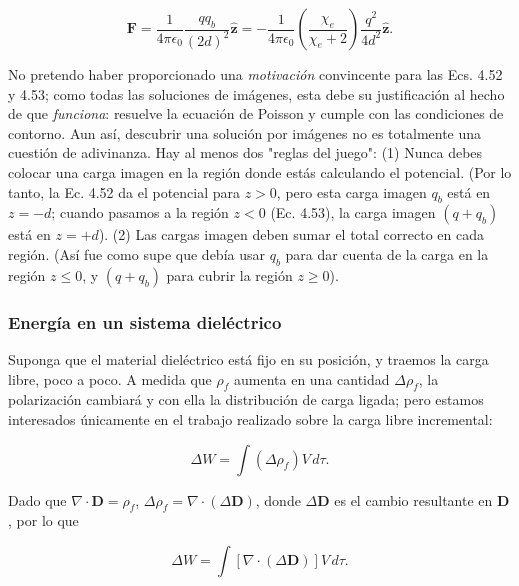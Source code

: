 \documentclass[12pt,a4paper]{report}
\newcommand{\esp}{\vspace{0.5cm}}
\begin{document}
	\esp
	
	\begin{equation}
		\mathbf{F} = \frac{1}{4\pi\epsilon_0} \frac{qq_b}{(2d)^2} \hat{\mathbf{z}} = -\frac{1}{4\pi\epsilon_0} \left( \frac{\chi_e}{\chi_e + 2} \right) \frac{q^2}{4d^2} \hat{\mathbf{z}}.
	\end{equation}
	
	\esp
	
	\noindent No pretendo haber proporcionado una \textit{motivación} convincente para las Ecs. 4.52 y 4.53; como todas las soluciones de imágenes, esta debe su justificación al hecho de que \textit{funciona}: resuelve la ecuación de Poisson y cumple con las condiciones de contorno. Aun así, descubrir una solución por imágenes no es totalmente una cuestión de adivinanza. Hay al menos dos "reglas del juego": (1) Nunca debes colocar una carga imagen en la región donde estás calculando el potencial. (Por lo tanto, la Ec. 4.52 da el potencial para $z > 0$, pero esta carga imagen $q_b$ está en $z = -d$; cuando pasamos a la región $z < 0$ (Ec. 4.53), la carga imagen $(q + q_b)$ está en $z = +d$). (2) Las cargas imagen deben sumar el total correcto en cada región. (Así fue como supe que debía usar $q_b$ para dar cuenta de la carga en la región $z \leq 0$, y $(q + q_b)$ para cubrir la región $z \geq 0$).
	
	\subsubsection{Energía en un sistema dieléctrico}
	
	Suponga que el material dieléctrico está fijo en su posición, y traemos la carga libre, poco a poco. A medida que $\rho_f$ aumenta en una cantidad $\Delta \rho_f$, la polarización cambiará y con ella la distribución de carga ligada; pero estamos interesados únicamente en el trabajo realizado sobre la carga libre incremental:
	
	\esp
	
	\begin{equation}
		\Delta W = \int (\Delta \rho_f) V \, d\tau.
	\end{equation}
	
	\esp
	
	\noindent Dado que $\nabla \cdot \mathbf{D} = \rho_f$, $\Delta \rho_f = \nabla \cdot (\Delta \mathbf{D})$, donde $\Delta \mathbf{D}$ es el cambio resultante en $\mathbf{D}$, por lo que
	
	\esp
	
	\begin{equation}
		\Delta W = \int [\nabla \cdot (\Delta \mathbf{D})] V \, d\tau.
	\end{equation}
	
\end{document}
